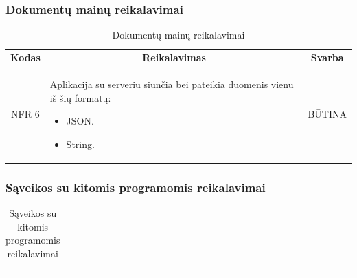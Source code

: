 \documentclass{VUMIFPSkursinis}
\begin{document}
{{{{{\begin{center}
\begin{table}[H]
\begin{tabular}{|p{2cm}|p{}|p{}|}
	\hline  	 	
	\end{tabular}
	
	\label{table:SąveikossuDBreikalavimai}
	\end{table}

\end{center}

\subsubsection{Dokumentų mainų reikalavimai}

\begin{center}
	\begin{table}[H]
	\caption{Dokumentų mainų reikalavimai}
	\begin{tabular}{|p{2cm}|p{}|p{}|}
	\hline
	    \rowcolor{lightgray}
		\multicolumn{3}{|c|}{Dokumentų mainų reikalavimai}\\
		
	\hline
		\multicolumn{1}{|c|}{{\bfseries Kodas}}&
		\multicolumn{1}{|c|}{{\bfseries Reikalavimas}}&
		\multicolumn{1}{|c|}{{\bfseries Svarba}}\\
	\hline 	
		\multicolumn{1}{|c|}{NFR 6}&
		{Aplikacija su serveriu siunčia bei pateikia duomenis vienu iš šių formatų:
			\begin{itemize}
			\item JSON.
			\item String.
			\end{itemize}}&
		\multicolumn{1}{|c|}{BŪTINA}\\	
	
	\hline 	 	 	
	\end{tabular}
	
	\label{table:Dokumentųmainųreikalavimai}
	\end{table}

\end{center}


\subsubsection{Sąveikos su kitomis programomis reikalavimai}

\begin{center}
	\begin{table}[H]
	\caption{Sąveikos su kitomis programomis reikalavimai}
	\begin{tabular}{|p{2cm}|p{}|p{}|}
	\hline
	    \rowcolor{lightgray}
		\multicolumn{3}{|c|}{Sąveikos su kitomis programomis reikalavimai}\\
		

\end{tabular}
\end{table}
\end{center}}}}}}
\end{document}
